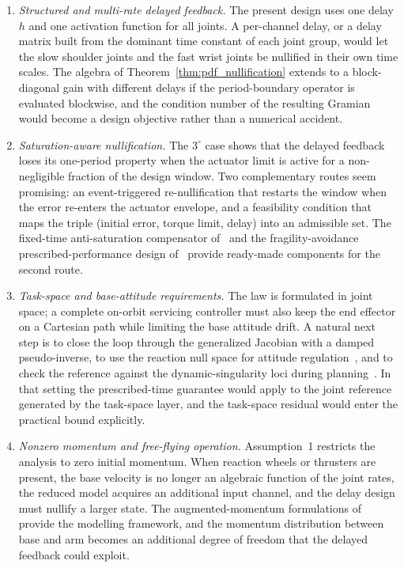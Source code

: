 \begin{enumerate}
\item \emph{Structured and multi-rate delayed feedback.} The present design uses one delay $h$ and one activation function for all joints. A per-channel delay, or a delay matrix built from the dominant time constant of each joint group, would let the slow shoulder joints and the fast wrist joints be nullified in their own time scales. The algebra of Theorem~\ref{thm:pdf_nullification} extends to a block-diagonal gain with different delays if the period-boundary operator is evaluated blockwise, and the condition number of the resulting Gramian would become a design objective rather than a numerical accident.
\item \emph{Saturation-aware nullification.} The $3^\circ$ case shows that the delayed feedback loses its one-period property when the actuator limit is active for a non-negligible fraction of the design window. Two complementary routes seem promising: an event-triggered re-nullification that restarts the window when the error re-enters the actuator envelope, and a feasibility condition that maps the triple (initial error, torque limit, delay) into an admissible set. The fixed-time anti-saturation compensator of~\cite{dou2025fractional} and the fragility-avoidance prescribed-performance design of~\cite{zhou2025saturated} provide ready-made components for the second route.
\item \emph{Task-space and base-attitude requirements.} The law is formulated in joint space; a complete on-orbit servicing controller must also keep the end effector on a Cartesian path while limiting the base attitude drift. A natural next step is to close the loop through the generalized Jacobian with a damped pseudo-inverse, to use the reaction null space for attitude regulation~\cite{zong2020reactionless,xu2016}, and to check the reference against the dynamic-singularity loci during planning~\cite{nanos2015avoiding,nanos2023fullpose}. In that setting the prescribed-time guarantee would apply to the joint reference generated by the task-space layer, and the task-space residual would enter the practical bound explicitly.
\item \emph{Nonzero momentum and free-flying operation.} Assumption~1 restricts the analysis to zero initial momentum. When reaction wheels or thrusters are present, the base velocity is no longer an algebraic function of the joint rates, the reduced model acquires an additional input channel, and the delay design must nullify a larger state. The augmented-momentum formulations of~\cite{nanos2017momentum,nanos2023fullpose} provide the modelling framework, and the momentum distribution between base and arm becomes an additional degree of freedom that the delayed feedback could exploit.

\end{enumerate}
